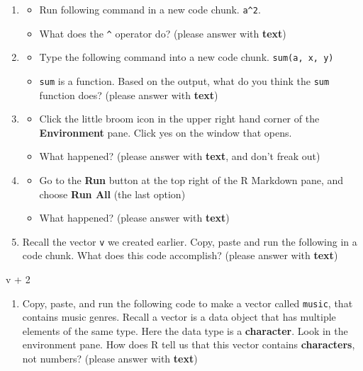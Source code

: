 \documentclass[
]{article}
\newenvironment{Shaded}{\begin{snugshade}}{\end{snugshade}}
\newcommand{\DecValTok}[1]{\textcolor[rgb]{0.00,0.00,0.81}{#1}}
\newcommand{\NormalTok}[1]{#1}
\newcommand{\SpecialCharTok}[1]{\textcolor[rgb]{0.00,0.00,0.00}{#1}}
\providecommand{\tightlist}{%
  \setlength{\itemsep}{0pt}\setlength{\parskip}{0pt}}
\begin{document}
\begin{enumerate}
\def\labelenumi{\arabic{enumi}.}
\item
  \begin{itemize}
  \tightlist
  \item
    Run following command in a new code chunk. \texttt{a\^{}2}.
  \item
    What does the \texttt{\^{}} operator do? (please answer with
    \textbf{text})
  \end{itemize}
\item
  \begin{itemize}
  \tightlist
  \item
    Type the following command into a new code chunk.
    \texttt{sum(a,\ x,\ y)}
  \item
    \texttt{sum} is a function. Based on the output, what do you think
    the \texttt{sum} function does? (please answer with \textbf{text})
  \end{itemize}
\item
  \begin{itemize}
  \tightlist
  \item
    Click the little broom icon in the upper right hand corner of the
    \textbf{Environment} pane. Click yes on the window that opens.
  \item
    What happened? (please answer with \textbf{text}, and don't freak
    out)
  \end{itemize}
\item
  \begin{itemize}
  \tightlist
  \item
    Go to the \textbf{Run} button at the top right of the R Markdown
    pane, and choose \textbf{Run All} (the last option)
  \item
    What happened? (please answer with \textbf{text})
  \end{itemize}
\item
  Recall the vector \texttt{v} we created earlier. Copy, paste and run
  the following in a code chunk. What does this code accomplish? (please
  answer with \textbf{text})
\end{enumerate}

\begin{Shaded}
\begin{Highlighting}[]
\NormalTok{v }\SpecialCharTok{+} \DecValTok{2}
\end{Highlighting}
\end{Shaded}

\begin{enumerate}
\def\labelenumi{\arabic{enumi}.}
\tightlist
\item
  Copy, paste, and run the following code to make a vector called
  \texttt{music}, that contains music genres. Recall a vector is a data
  object that has multiple elements of the same type. Here the data type
  is a \textbf{character}. Look in the environment pane. How does R tell
  us that this vector contains \textbf{characters}, not numbers? (please
  answer with \textbf{text})
\end{enumerate}
\end{document}
